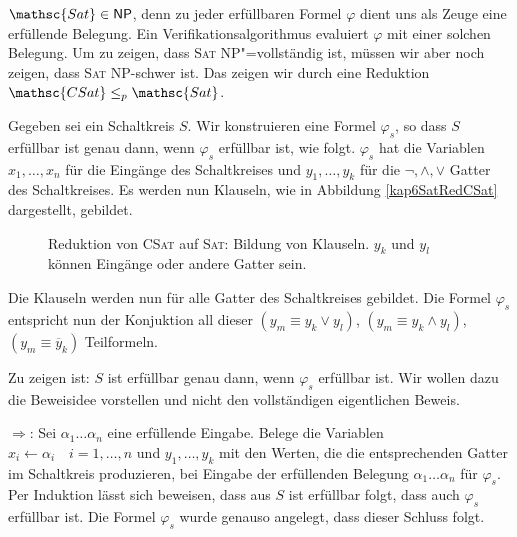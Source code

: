 \begin{Bew}
  \hspace{\parindent}$\mathsc{Sat} \in \mathsf{NP}$, denn zu jeder erfüllbaren Formel $\varphi$ dient uns als Zeuge eine erfüllende Belegung. Ein Verifikationsalgorithmus evaluiert $\varphi$ mit einer solchen Belegung. Um zu zeigen, dass \textsc{Sat} \textsf{NP}"=vollständig ist, müssen wir aber noch zeigen, dass \textsc{Sat} \textsf{NP}-schwer ist. Das zeigen wir durch eine Reduktion $\mathsc{CSat} \le_p \mathsc{Sat}$.
  
  Gegeben sei ein Schaltkreis $S$. Wir konstruieren eine Formel $\varphi_s$, so dass $S$ erfüllbar ist genau dann, wenn $\varphi_s$ erfüllbar ist, wie folgt.
  $\varphi_s$ hat die Variablen $x_1, \ldots, x_n$ für die Eingänge des Schaltkreises und $y_1, \ldots, y_k$ für die $\neg, \wedge, \vee$ Gatter des Schaltkreises. Es werden nun Klauseln, wie in Abbildung \vref{kap6SatRedCSat} dargestellt, gebildet.
  
  \begin{figure}[htb]
    \centering
    \hspace{1em}
    \caption{Reduktion von \textsc{CSat} auf \textsc{Sat}: Bildung von Klauseln. $y_k$ und $y_l$ können Eingänge oder andere Gatter sein.}
    \label{kap6SatRedCSat}
  \end{figure}
  
  Die Klauseln werden nun für alle Gatter des Schaltkreises gebildet. Die Formel $\varphi_s$ entspricht nun der Konjuktion all dieser $(y_m \equiv y_k \vee y_l)$, $(y_m \equiv y_k \wedge y_l)$, $(y_m \equiv \overline{y}_k)$ Teilformeln.

  Zu zeigen ist: $S$ ist erfüllbar genau dann, wenn $\varphi_s$ erfüllbar ist. Wir wollen dazu die Beweisidee vorstellen und nicht den vollständigen eigentlichen Beweis.
  
  \glq$\Rightarrow$\grq: Sei $\alpha_1 \ldots \alpha_n$ eine erfüllende Eingabe. Belege die Variablen $x_i \leftarrow \alpha_i \quad i=1, \ldots, n$ und $y_1, \ldots, y_k$ mit den Werten, die die entsprechenden Gatter im Schaltkreis produzieren, bei Eingabe der erfüllenden Belegung $\alpha_1 \ldots \alpha_n$ für $\varphi_s$. Per Induktion lässt sich beweisen, dass aus $S$ ist erfüllbar folgt, dass auch $\varphi_s$ erfüllbar ist. Die Formel $\varphi_s$ wurde genauso angelegt, dass dieser Schluss folgt.
  

\end{Bew}
